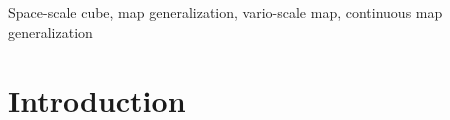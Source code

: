 \documentclass[]{interact}
\begin{document}
\begin{abstract}
\end{abstract}

\begin{keywords}
Space-scale cube, map generalization, vario-scale map, continuous map generalization
\end{keywords}



\pagebreak

\section{Introduction}
\label{sec:introduction}
\end{document}
